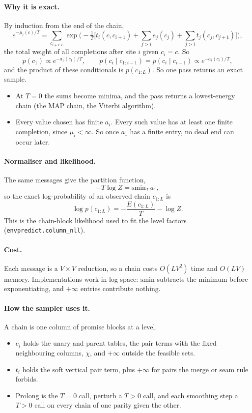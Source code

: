 \documentclass[11pt]{article}
\newcommand{\1}{\mathds{1}}
\begin{document}
\paragraph{Why it is exact.} By induction from the end of the chain,
\[
  e^{-\mu_i(c)/T} = \sum_{c_{i+1:L}} \exp\!\Big(-\tfrac1T\Big[t_i(c, c_{i+1})
    + \textstyle\sum_{j > i} e_j(c_j) + \sum_{j > i} t_j(c_j, c_{j+1})\Big]\Big),
\]
the total weight of all completions after site $i$ given $c_i = c$. So
\[
  p(c_1) \propto e^{-a_1(c_1)/T}, \qquad
  p(c_i \mid c_{1:i-1}) = p(c_i \mid c_{i-1}) \propto e^{-a_i(c_i)/T},
\]
and the product of these conditionals is $p(c_{1:L})$. So one pass returns an exact sample.
\begin{itemize}
  \item At $T = 0$ the sums become minima, and the pass returns a lowest-energy chain (the MAP
        chain, the Viterbi algorithm).
  \item Every value chosen has finite $a_i$. Every such value has at least one finite
        completion, since $\mu_i < \infty$. So once $a_1$ has a finite entry, no dead end can
        occur later.
\end{itemize}

\paragraph{Normaliser and likelihood.} The same messages give the partition function,
\[
  -T \log Z = \mathrm{smin}_T\, a_1,
\]
so the exact log-probability of an observed chain $c_{1:L}$ is
\[
  \log p(c_{1:L}) = -\frac{E(c_{1:L})}{T} - \log Z.
\]
This is the chain-block likelihood used to fit the level factors
(\texttt{envpredict.column\_nll}).

\paragraph{Cost.} Each message is a $V \times V$ reduction, so a chain costs $O(L V^2)$ time and
$O(L V)$ memory. Implementations work in log space: $\mathrm{smin}$ subtracts the minimum
before exponentiating, and $+\infty$ entries contribute nothing.

\paragraph{How the sampler uses it.} A chain is one column of promise blocks at a level.
\begin{itemize}
  \item $e_i$ holds the unary and parent tables, the pair terms with the fixed neighbouring
        columns, $\chi$, and $+\infty$ outside the feasible sets.
  \item $t_i$ holds the soft vertical pair term, plus $+\infty$ for pairs the merge or seam
        rule forbids.
  \item Prolong is the $T = 0$ call, perturb a $T > 0$ call, and each smoothing step a $T > 0$
        call on every chain of one parity given the other.
\end{itemize}
\end{document}
